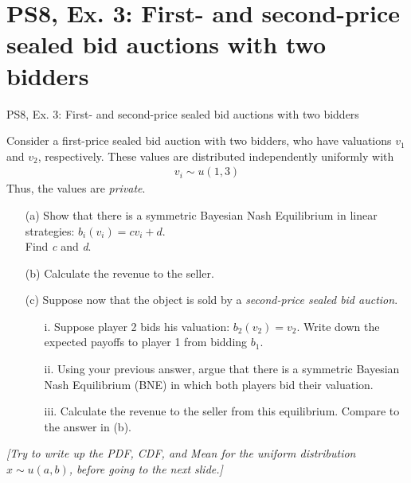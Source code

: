 \section{PS8, Ex. 3: First- and second-price sealed bid auctions with two bidders}

\begin{frame}{PS8, Ex. 3: First- and second-price sealed bid auctions with two bidders}
    \begin{multicols}{2}
      Consider a first-price sealed bid auction with two bidders, who have valuations $v_1$ and $v_2$, respectively. These values are distributed independently uniformly with
      \begin{align*}
        v_i\sim u(1,3)
      \end{align*}
      Thus, the values are \textit{private}.
      \begin{itemize}
        \item[(a)] Show that there is a symmetric Bayesian Nash Equilibrium in linear strategies: $b_i(v_i) = cv_i + d$.\\
                   Find \textit{c} and \textit{d}.
        \item[(b)] Calculate the revenue to the seller.
      \end{itemize}
      \vfill\null\columnbreak
      \begin{itemize}
        \item[(c)] Suppose now that the object is sold by a \textit{second-price sealed bid auction}.
        \begin{itemize}\normalsize
          \item[i.]   Suppose player 2 bids his valuation: $b_2(v_2) = v_2$. Write down the expected payoffs to player 1 from bidding $b_1$.
          \item[ii.]  Using your previous answer, argue that there is a symmetric Bayesian Nash Equilibrium (BNE) in which both players bid their valuation.
          \item[iii.] Calculate the revenue to the seller from this equilibrium. Compare to the answer in (b).
        \end{itemize}
      \end{itemize}
      \vfill\null
    \end{multicols}
    \vspace{-8pt}
    \textit{[Try to write up the PDF, CDF, and Mean for the uniform distribution $x\sim u(a, b)$, before going to the next slide.]}
\end{frame}
